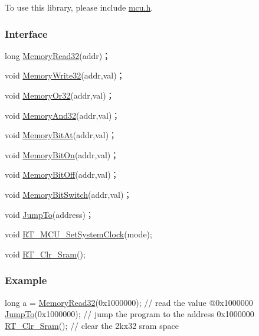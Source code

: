 To use this library, please include {\ttfamily \mbox{\hyperlink{a00068}{mcu.\+h}}}.

\subsubsection*{Interface}


\begin{DoxyCode}
\textcolor{keywordtype}{long} \mbox{\hyperlink{a00068_a2d484dc15bdf30ee11ab3b05f31f0e16}{MemoryRead32}}(addr)；

\textcolor{keywordtype}{void} \mbox{\hyperlink{a00068_a6b9732365b12e48ddb89fe1028b975b0}{MemoryWrite32}}(addr,val)；

\textcolor{keywordtype}{void} \mbox{\hyperlink{a00068_a27874a97deab7cecdde5ddecf466e31e}{MemoryOr32}}(addr,val)；

\textcolor{keywordtype}{void} \mbox{\hyperlink{a00068_ad87cedffcaadc51db22594fce55173d4}{MemoryAnd32}}(addr,val)；

\textcolor{keywordtype}{void} \mbox{\hyperlink{a00068_afc530c7e6b49b0ca97c1ad9dac1c4750}{MemoryBitAt}}(addr,val)；

\textcolor{keywordtype}{void} \mbox{\hyperlink{a00068_a99a602346038b54068758ef00c42d1b6}{MemoryBitOn}}(addr,val)；

\textcolor{keywordtype}{void} \mbox{\hyperlink{a00068_a04c34919a950117ae7da2dc5a235622b}{MemoryBitOff}}(addr,val)；

\textcolor{keywordtype}{void} \mbox{\hyperlink{a00068_ae49e41753dbce64185d380d307ade78d}{MemoryBitSwitch}}(addr,val)；

\textcolor{keywordtype}{void} \mbox{\hyperlink{a00068_a38c3a81fc94bff4cb6654061b7d21909}{JumpTo}}(address)；

\textcolor{keywordtype}{void} \mbox{\hyperlink{a00068_a017f8665ec51267680fc0e536db19c13}{RT\_MCU\_SetSystemClock}}(mode);

\textcolor{keywordtype}{void} \mbox{\hyperlink{a00065_a42674a2ca7d088e68de4e2aa81ec597c}{RT\_Clr\_Sram}}();
\end{DoxyCode}


\subsubsection*{Example}


\begin{DoxyCode}
\textcolor{keywordtype}{long} a = \mbox{\hyperlink{a00068_a2d484dc15bdf30ee11ab3b05f31f0e16}{MemoryRead32}}(0x1000000);      \textcolor{comment}{// read the value @0x1000000}
\mbox{\hyperlink{a00068_a38c3a81fc94bff4cb6654061b7d21909}{JumpTo}}(0x1000000);                     \textcolor{comment}{// jump the program to the address 0x1000000}
\mbox{\hyperlink{a00065_a42674a2ca7d088e68de4e2aa81ec597c}{RT\_Clr\_Sram}}();                         \textcolor{comment}{// clear the 2kx32 sram space}
\end{DoxyCode}
 